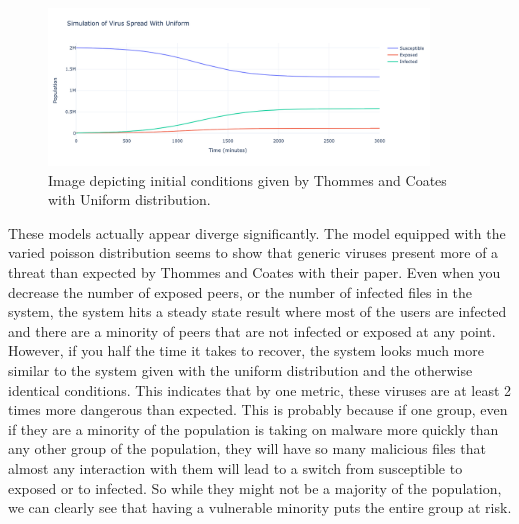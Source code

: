 \documentclass[12pt, oneside]{article}
\begin{document}
        \begin{figure}[htbp]
            \centering
            \includegraphics[width=0.9\textwidth]{2MUniform.png}
            \caption{Image depicting initial conditions given by Thommes and Coates with Uniform distribution.}
        \end{figure}
        These models actually appear diverge significantly. The model equipped with the varied poisson distribution seems to show that generic viruses present more of a threat than expected by Thommes and Coates
        with their paper. Even when you decrease the number of exposed peers, or the number of infected files in the system, the system hits a steady state result where
        most of the users are infected and there are a minority of peers that are not infected or exposed at any point. However, if you half the time it takes to recover, the system looks much more similar to the
        system given with the uniform distribution and the otherwise identical conditions. This indicates that by one metric, these viruses are at least 2 times more dangerous than expected. This is probably because
        if one group, even if they are a minority of the population is taking on malware more quickly than any other group of the population, they will have so many malicious files that almost any interaction with them
        will lead to a switch from susceptible to exposed or to infected. So while they might not be a majority of the population, we can clearly see that having a vulnerable minority puts the entire group at risk.
\end{document}
